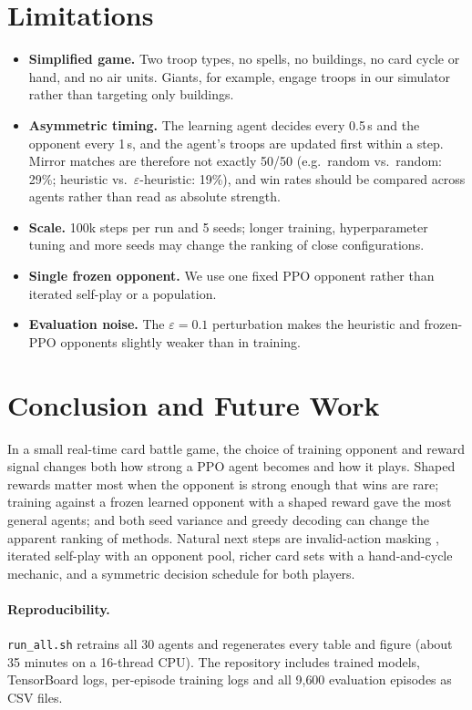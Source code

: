 \documentclass[11pt]{article}
\begin{document}
\section{Limitations}

\begin{itemize}
  \item \textbf{Simplified game.} Two troop types, no spells, no buildings,
  no card cycle or hand, and no air units. Giants, for example, engage troops
  in our simulator rather than targeting only buildings.
  \item \textbf{Asymmetric timing.} The learning agent decides every 0.5\,s and
  the opponent every 1\,s, and the agent's troops are updated first within
  a step. Mirror matches are therefore not exactly 50/50 (e.g.\ random vs.\
  random: 29\%; heuristic vs.\ $\varepsilon$-heuristic: 19\%), and win rates
  should be compared across agents rather than read as absolute strength.
  \item \textbf{Scale.} 100k steps per run and 5 seeds; longer training,
  hyperparameter tuning and more seeds may change the ranking of close
  configurations.
  \item \textbf{Single frozen opponent.} We use one fixed PPO opponent rather
  than iterated self-play or a population.
  \item \textbf{Evaluation noise.} The $\varepsilon=0.1$ perturbation makes the
  heuristic and frozen-PPO opponents slightly weaker than in training.
\end{itemize}

\section{Conclusion and Future Work}

In a small real-time card battle game, the choice of training opponent and
reward signal changes both how strong a PPO agent becomes and how it plays.
Shaped rewards matter most when the opponent is strong enough that wins are
rare; training against a frozen learned opponent with a shaped reward gave
the most general agents; and both seed variance and greedy decoding can
change the apparent ranking of methods. Natural next steps are invalid-action
masking \citep{huang2022masking}, iterated self-play with an opponent pool,
richer card sets with a hand-and-cycle mechanic, and a symmetric decision
schedule for both players.

\paragraph{Reproducibility.}
\texttt{run\_all.sh} retrains all 30 agents and regenerates every table and
figure (about 35 minutes on a 16-thread CPU). The repository includes trained
models, TensorBoard logs, per-episode training logs and all 9{,}600 evaluation
episodes as CSV files.



\end{document}
